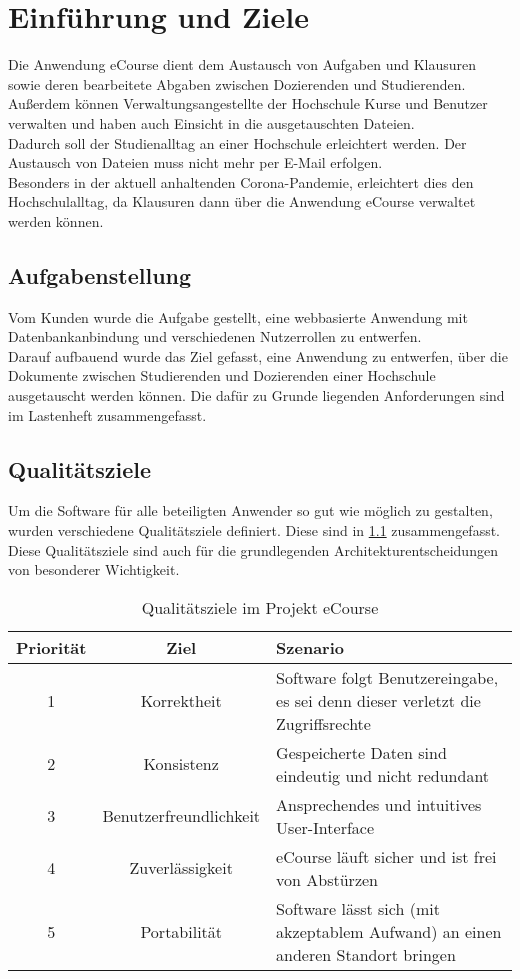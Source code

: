 
\chapter{Einführung und Ziele}
Die Anwendung eCourse dient dem Austausch von \gls{Aufgabe}n und \gls{Klausur}en sowie deren \gls{bearbeitete Abgabe}n zwischen \gls{Dozierende}n und \gls{Studierende}n. Außerdem können \gls{Verwaltungsangestellte der Hochschule} \gls{Kurs}e und Benutzer verwalten und haben auch Einsicht in die ausgetauschten Dateien. \\
Dadurch soll der Studienalltag an einer Hochschule erleichtert werden. Der Austausch von Dateien muss nicht mehr per E-Mail erfolgen. \\
Besonders in der aktuell anhaltenden Corona-Pandemie, erleichtert dies den Hochschulalltag, da \gls{Klausur}en dann über die Anwendung eCourse verwaltet werden können.  

\section{Aufgabenstellung}
\label{sec:Aufgabe}
Vom Kunden wurde die Aufgabe gestellt, eine webbasierte Anwendung mit Datenbankanbindung und verschiedenen Nutzerrollen zu entwerfen. \\
Darauf aufbauend wurde das Ziel gefasst, eine Anwendung zu entwerfen, über die Dokumente zwischen \gls{Studierende}n und \gls{Dozierende}n einer Hochschule ausgetauscht werden können. Die dafür zu Grunde liegenden Anforderungen sind im Lastenheft zusammengefasst.

\section{Qualitätsziele}
\label{sec:Quali}
Um die Software für alle beteiligten Anwender so gut wie möglich zu gestalten, wurden verschiedene Qualitätsziele definiert. Diese sind in \ref{tab:Qualitätsziele} zusammengefasst. Diese Qualitätsziele sind auch für die grundlegenden Architekturentscheidungen von besonderer Wichtigkeit.

\begin{table}[H]
\centering
\begin{tabularx}{\textwidth}[H]{|c|c|X|}
\hline
Priorität &	Ziel & Szenario\\
\hline
1 & Korrektheit & Software folgt Benutzereingabe, es sei denn dieser verletzt die Zugriffsrechte \\
\hline
2 & Konsistenz & Gespeicherte Daten sind eindeutig und nicht redundant \\
\hline
3 & Benutzerfreundlichkeit & Ansprechendes und intuitives User-Interface \\
\hline
4 & Zuverlässigkeit & eCourse läuft sicher und ist frei von Abstürzen \\
\hline
5 & Portabilität & Software lässt sich (mit akzeptablem Aufwand) an einen anderen Standort bringen\\
\hline
\end{tabularx}
\caption{Qualitätsziele im Projekt eCourse}
\label{tab:Qualitätsziele}
\end{table}

